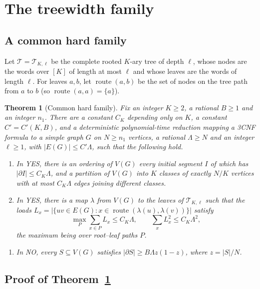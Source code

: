 \documentclass[11pt,letterpaper]{article}
\newtheorem{theorem}{Theorem}[section]
\theoremstyle{definition}
\theoremstyle{remark}
\newcommand{\Tr}{\mathcal T}
\DeclareMathOperator{\route}{route}
\begin{document}
\section{The treewidth family}\label{sec:tw}

\subsection{A common hard family}

Let \(\Tr=\Tr_{K,\ell}\) be the complete rooted \(K\)-ary tree of depth
\(\ell\), whose nodes are the words over \([K]\) of length at most \(\ell\)
and whose leaves are the words of length \(\ell\). For leaves \(a,b\), let
\(\route(a,b)\) be the set of nodes on the tree path from \(a\) to \(b\)
(so \(\route(a,a)=\{a\}\)).

\begin{theorem}[Common hard family]\label{th:family}
Fix an integer \(K\ge2\), a rational \(B\ge1\) and an integer \(n_1\). There
are a constant \(C_K\) depending only on \(K\), a constant
\(C'=C'(K,B)\), and a deterministic polynomial-time reduction mapping a
3CNF formula to a simple graph \(G\) on \(N\ge n_1\) vertices, a rational
\(\Lambda\ge N\) and an integer \(\ell\ge1\), with \(|E(G)|\le C'\Lambda\),
such that the following hold.
\begin{enumerate}[label=\textup{(Y\arabic*)}]
\item In YES, there is an ordering of \(V(G)\) every initial segment \(I\)
of which has \(|\partial I|\le C_K\Lambda\), and a partition of \(V(G)\)
into \(K\) classes of exactly \(N/K\) vertices with at most \(C_K\Lambda\)
edges joining different classes.
\item In YES, there is a map \(\lambda\) from \(V(G)\) to the leaves of
\(\Tr_{K,\ell}\) such that the loads
\(L_x=|\{uv\in E(G):x\in\route(\lambda(u),\lambda(v))\}|\) satisfy
\[
\max_{P}\sum_{x\in P}L_x\le C_K\Lambda,\qquad\sum_xL_x^2\le C_K\Lambda^2,
\]
the maximum being over root--leaf paths \(P\).
\end{enumerate}
\begin{enumerate}[label=\textup{(N)}]
\item In NO, every \(S\subseteq V(G)\) satisfies
\(|\partial S|\ge B\Lambda z(1-z)\), where \(z=|S|/N\).
\end{enumerate}
\end{theorem}

\subsection{Proof of Theorem~\ref{th:family}}
\end{document}

